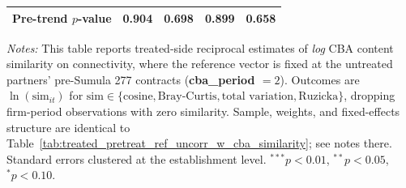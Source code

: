 \begin{table}[H]
\begin{tabular}{lcccc}
Pre-trend $p$-value & 0.904 & 0.698 & 0.899 & 0.658 \\
\bottomrule
\end{tabular}
\begin{minipage}{\linewidth}
\footnotesize\vspace{4pt}
\textit{Notes:} This table reports treated-side reciprocal estimates of \emph{log} CBA content similarity on connectivity, where the reference vector is fixed at the untreated partners' pre-Sumula 277 contracts (\textbf{cba\_period $= 2$}). Outcomes are $\ln(\text{sim}_{it})$ for $\text{sim} \in \{\text{cosine}, \text{Bray-Curtis}, \text{total variation}, \text{Ruzicka}\}$, dropping firm-period observations with zero similarity. Sample, weights, and fixed-effects structure are identical to Table~\ref{tab:treated_pretreat_ref_uncorr_w_cba_similarity}; see notes there. Standard errors clustered at the establishment level. $^{***}p<0.01$, $^{**}p<0.05$, $^{*}p<0.10$.
\end{minipage}
\end{table}
